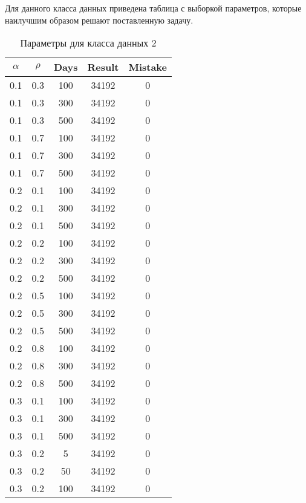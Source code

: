 Для данного класса данных приведена таблица с выборкой параметров, которые наилучшим образом решают поставленную задачу.

\begin{center}
    \captionsetup{justification=raggedright,singlelinecheck=off}
    \begin{longtable}[c]{|c|c|c|c|c|}
    \caption{Параметры для класса данных 2\label{tbl:table_kd2}}\\ \hline
        $\alpha$ & $\rho$ & Days & Result & Mistake \\ \hline
        0.1 &  0.3 &  100 & 34192 &     0 \\
        0.1 &  0.3 &  300 & 34192 &     0 \\
        0.1 &  0.3 &  500 & 34192 &     0 \\ \hline
        0.1 &  0.7 &  100 & 34192 &     0 \\
        0.1 &  0.7 &  300 & 34192 &     0 \\
        0.1 &  0.7 &  500 & 34192 &     0 \\ \hline
        0.2 &  0.1 &  100 & 34192 &     0 \\
        0.2 &  0.1 &  300 & 34192 &     0 \\
        0.2 &  0.1 &  500 & 34192 &     0 \\ \hline
        0.2 &  0.2 &  100 & 34192 &     0 \\
        0.2 &  0.2 &  300 & 34192 &     0 \\
        0.2 &  0.2 &  500 & 34192 &     0 \\ \hline
        0.2 &  0.5 &  100 & 34192 &     0 \\
        0.2 &  0.5 &  300 & 34192 &     0 \\
        0.2 &  0.5 &  500 & 34192 &     0 \\ \hline
        0.2 &  0.8 &  100 & 34192 &     0 \\
        0.2 &  0.8 &  300 & 34192 &     0 \\
        0.2 &  0.8 &  500 & 34192 &     0 \\ \hline
        0.3 &  0.1 &  100 & 34192 &     0 \\
        0.3 &  0.1 &  300 & 34192 &     0 \\
        0.3 &  0.1 &  500 & 34192 &     0 \\ \hline
        0.3 &  0.2 &    5 & 34192 &     0 \\
        0.3 &  0.2 &   50 & 34192 &     0 \\
        0.3 &  0.2 &  100 & 34192 &     0 \\

\end{longtable}
\end{center}
